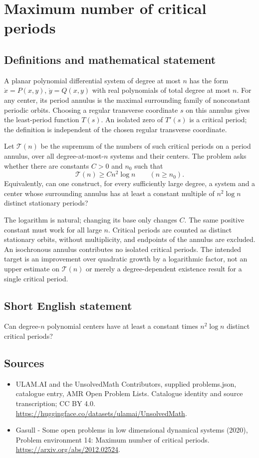 \documentclass[11pt,a4paper]{article}
\begin{document}
\section*{Maximum number of critical periods}\label{statement}

\subsection{Definitions and mathematical statement}
A planar polynomial differential system of degree at most $n$ has the form
$\dot x=P(x,y)$, $\dot y=Q(x,y)$ with real polynomials of total degree at
most $n$. For any center, its period annulus is the maximal surrounding
family of nonconstant periodic orbits. Choosing a regular transverse
coordinate $s$ on this annulus gives the least-period function $T(s)$.
An isolated zero of $T'(s)$ is a critical period; the definition is
independent of the chosen regular transverse coordinate.

Let $\mathcal T(n)$ be the supremum of the numbers of such critical periods
on a period annulus, over all degree-at-most-$n$ systems and their centers.
The problem asks whether there are constants $C>0$ and $n_0$ such that
\[
 \mathcal T(n)\ge C n^2\log n\qquad(n\ge n_0).
\]
Equivalently, can one construct, for every sufficiently large degree, a
system and a center whose surrounding annulus has at least a constant
multiple of $n^2\log n$ distinct stationary periods?

The logarithm is natural; changing its base only changes $C$. The same
positive constant must work for all large $n$. Critical periods are counted
as distinct stationary orbits, without multiplicity, and endpoints of the
annulus are excluded. An isochronous annulus contributes no isolated
critical periods. The intended target is an improvement over quadratic
growth by a logarithmic factor, not an upper estimate on $\mathcal T(n)$
or merely a degree-dependent existence result for a single critical period.
\subsection{Short English statement}
Can degree-$n$ polynomial centers have at least a constant times $n^2\log n$ distinct critical periods?
\subsection{Sources}
\begin{itemize}
\item[S1] ULAM.AI and the UnsolvedMath Contributors, supplied problems.json, catalogue entry, AMR Open Problem Lists. Catalogue identity and source transcription; CC BY 4.0.
\url{https://huggingface.co/datasets/ulamai/UnsolvedMath}.
\item[S2] Gasull - Some open problems in low dimensional dynamical systems (2020), Problem environment 14: Maximum number of critical periods. 
\url{https://arxiv.org/abs/2012.02524}.
\end{itemize}
\end{document}
